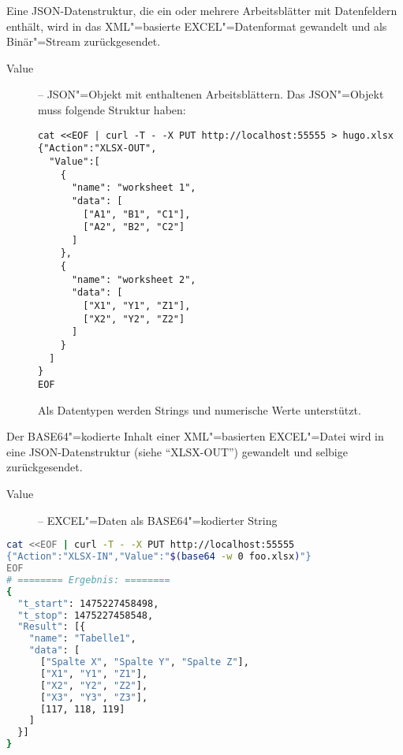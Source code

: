 \documentclass[titlepage=false,toc=nobibliography]{vl-report}
\newcommand*\action[1]{\fbox{\nolinkurl{#1}}\medskip\par}
\begin{document}
\begin{description}
\begin{description}
    \item \action{XLSX-OUT}

      \noindent Eine JSON-Datenstruktur, die ein oder mehrere Arbeitsblätter
      mit Datenfeldern enthält, wird in das XML"=basierte EXCEL"=Datenformat
      gewandelt und als Binär"=Stream zurückgesendet.

      \begin{description}

        \item[Value] -- JSON"=Objekt mit enthaltenen Arbeitsblättern. Das
        JSON"=Objekt muss folgende Struktur haben:
\begin{lstlisting}[language={}]
cat <<EOF | curl -T - -X PUT http://localhost:55555 > hugo.xlsx
{"Action":"XLSX-OUT",
  "Value":[
    {
      "name": "worksheet 1",
      "data": [
        ["A1", "B1", "C1"],
        ["A2", "B2", "C2"]
      ]
    }, 
    {
      "name": "worksheet 2",
      "data": [
        ["X1", "Y1", "Z1"],
        ["X2", "Y2", "Z2"]
      ]
    }
  ]
}
EOF
\end{lstlisting}
      Als Datentypen werden Strings und numerische Werte unterstützt.
      \end{description}

    \item \action{XLSX-IN}

      \noindent Der BASE64"=kodierte Inhalt einer XML"=basierten EXCEL"=Datei
      wird in eine JSON-Datenstruktur (siehe "`XLSX-OUT"') gewandelt und
      selbige zurückgesendet.

      \begin{description}

        \item[Value] -- EXCEL"=Daten als BASE64"=kodierter String

      \end{description}
\begin{lstlisting}[language=bash]
cat <<EOF | curl -T - -X PUT http://localhost:55555
{"Action":"XLSX-IN","Value":"$(base64 -w 0 foo.xlsx)"}
EOF
# ======== Ergebnis: ========
{
  "t_start": 1475227458498,
  "t_stop": 1475227458548,
  "Result": [{
    "name": "Tabelle1",
    "data": [
      ["Spalte X", "Spalte Y", "Spalte Z"],
      ["X1", "Y1", "Z1"],
      ["X2", "Y2", "Z2"],
      ["X3", "Y3", "Z3"],
      [117, 118, 119]
    ]
  }]
}
\end{lstlisting}

    \item \action{RANDOM}


\end{description}
\end{description}
\end{document}
